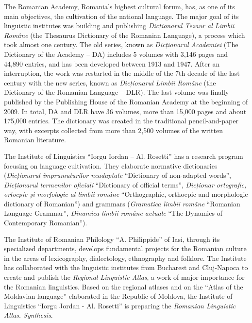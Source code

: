 \begin{multicols}{2}
The Romanian Academy, Romania’s highest cultural forum, has, as one of its main objectives, the cultivation of the national language. The major goal of its linguistic institutes was building and publishing \textit{Dicționarul Tezaur al Limbii Române} (the Thesaurus Dictionary of the Romanian Language), a process which took almost one century. The old series, known as \textit{Dicționarul Academiei} (The Dictionary of the Academy -- DA) includes 5 volumes with 3,146 pages and 44,890 entries, and has been developed between 1913 and 1947. After an interruption, the work was restarted in the middle of the 7th decade of the last century with the new series, known as \textit{Dicționarul Limbii Române} (the Dictionary of the Romanian Language -- DLR). The last volume was finally published by the Publishing House of the Romanian Academy at the beginning of 2009. In total, DA and DLR have 36 volumes, more than 15,000 pages and about 175,000 entries. The dictionary was created in the traditional pencil-and-paper way, with excerpts collected from more than 2,500 volumes of the written Romanian literature.

The Institute of Linguistics ``Iorgu Iordan -- Al. Rosetti'' has a research program focusing on language cultivation. They elaborate normative dictionaries (\textit{Dicționarul împrumuturilor neadaptate} ``Dictionary of non-adapted words'', \textit{Dicționarul termenilor oficiali} ``Dictionary of official terms'', \textit{Dicționar ortografic, ortoepic și morfologic al limbii române} ``Orthographic, orthoepic and morphologic dictionary of Romanian'') and grammars (\textit{Gramatica limbii române} ``Romanian Language Grammar'', \textit{Dinamica limbii române actuale} ``The Dynamics of Contemporary Romanian'').

The Institute of Romanian Philology ``A. Philippide'' of Iasi, through its specialized departments, develops fundamental projects for the Romanian culture in the areas of lexicography, dialectology, ethnography and folklore. The Institute has collaborated with the linguistic institutes from Bucharest and Cluj-Napoca to create and publish the \textit{Regional Linguistic Atlas}, a work of major importance for the Romanian linguistics. Based on the regional atlases and on the ``Atlas of the Moldavian language'' elaborated in the Republic of Moldova, the Institute of Linguistics ``Iorgu Jordan - Al. Rosetti'' is preparing the \textit{Romanian Linguistic Atlas. Synthesis}.


\end{multicols}
